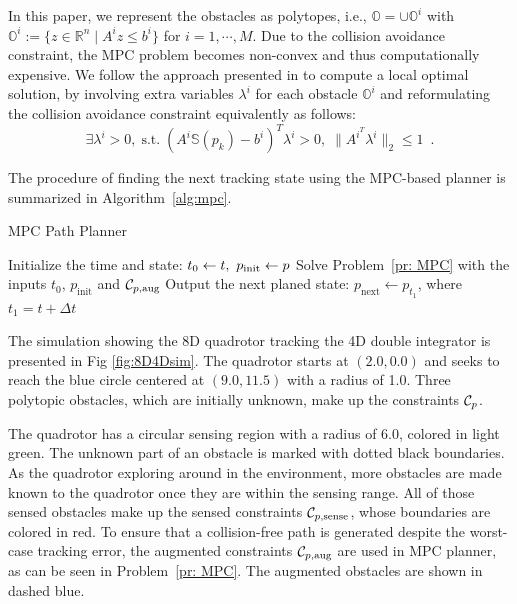 %
\begin{remark}
In this paper, we represent the obstacles as polytopes, i.e., $\mathbb{O} = \cup \mathbb{O}^{i}$ with $\mathbb{O}^{i}:= \{z\in\mathbb{R}^{n} \mid A^{i}z\leq b^{i}\}$ for $i = 1,\cdots ,M$. Due to the collision avoidance constraint, the MPC problem becomes non-convex and thus computationally expensive. We follow the approach presented in \cite{Zhang2017} to compute a local optimal solution, by involving extra variables $\lambda^{i}$ for each obstacle $\mathbb{O}^{i}$ and reformulating the collision avoidance constraint equivalently as follows: 
%
\begin{equation}
\exists \lambda^{i} >0, \; \mbox{s.t.} \; (A^{i} \mathbb{S}(p_k) - b^{i})^{T}\lambda^{i}  > 0, \; \|A^{i^{T}}\lambda^{i}\|_2\leq 1\enspace .
\end{equation}
%
\end{remark}
%
The procedure of finding the next tracking state using the MPC-based planner is summarized in Algorithm~\ref{alg:mpc}.
%
\begin{algorithm}	
	\caption{MPC Path Planner}
	\label{alg:mpc}
	\begin{algorithmic}[1]
 		\STATE Initialize the time and state: $t_0 \leftarrow t, \ p_{\text{init}} \leftarrow p$
			\STATE Solve Problem~\ref{pr: MPC} with the inputs $t_0$, $p_{\text{init}}$ and $\mathcal C_{p,\text{aug}}$
		\ENDIF
          \STATE Output the next planed state: $p_{\text{next}} \leftarrow p_{t_1}$, where $t_1 = t + \Delta t$
	\end{algorithmic}
\end{algorithm}

The simulation showing the 8D quadrotor tracking the 4D double integrator is presented in Fig \ref{fig:8D4Dsim}. The quadrotor starts at $(2.0,0.0)$ and seeks to reach the blue circle centered at $(9.0,11.5)$ with a radius of 1.0. Three polytopic obstacles, which are initially unknown, make up the constraints $\mathcal C_p$. 

The quadrotor has a circular sensing region with a radius of 6.0, colored in light green. The unknown part of an obstacle is marked with dotted black boundaries. As the quadrotor exploring around in the environment, more obstacles are made known to the quadrotor once they are within the sensing range. All of those sensed obstacles make up the sensed constraints $\mathcal C_{p,\text{sense}}$, whose boundaries are colored in red. To ensure that a collision-free path is generated despite the worst-case tracking error, the augmented constraints $\mathcal C_{p,\text{aug}}$ are used in MPC planner, as can be seen in Problem~\ref{pr: MPC}. The augmented obstacles are shown in dashed blue.

